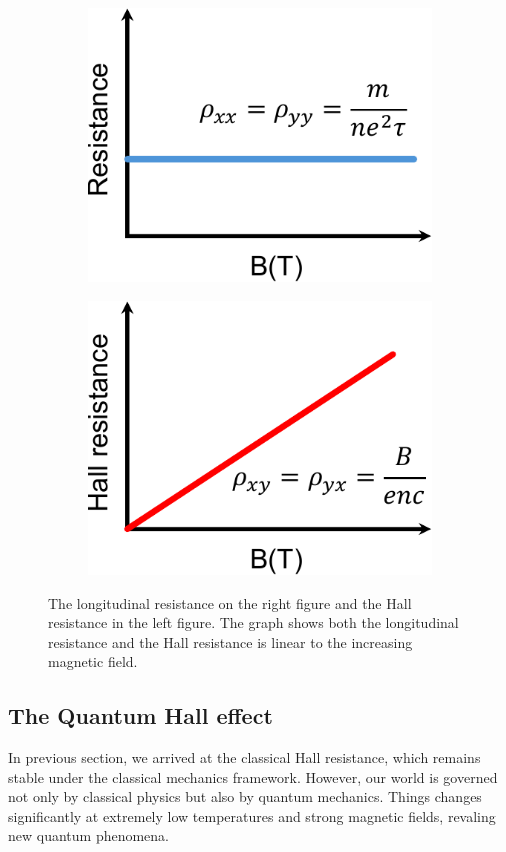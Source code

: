 \documentclass{report}
\begin{document}
\begin{figure}[htb]
	\centering
	\begin{subfigure}[b]{0.495\textwidth}
		\centering
		{\includegraphics[width=0.75\linewidth]{pic/classRess.pdf}}
	\end{subfigure}
	\begin{subfigure}[b]{0.495\textwidth}
		\centering
		\includegraphics[width=0.75\linewidth]{pic/HallRess.pdf}
	\end{subfigure}
	\caption[Logitudinal resistance and Hall resistance plot.]{
		The longitudinal resistance on the right figure and the Hall resistance in the left figure. The graph shows both the longitudinal resistance and the Hall resistance is linear to the increasing magnetic field.
	}
\end{figure}
\subsection{The Quantum Hall effect}
In previous section, we arrived at the classical Hall resistance, which remains stable under the classical mechanics framework. However, our world is governed not only by classical physics but also by quantum mechanics. Things changes significantly at extremely low temperatures and strong magnetic fields, revaling new quantum phenomena.
\end{document}
